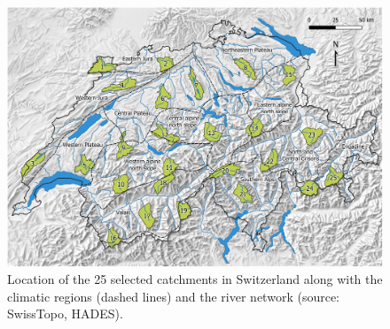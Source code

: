 \documentclass[draft]{agujournal2019}
\begin{document}
\begin{figure}[hbt]
	\noindent\includegraphics[width=140mm]{figures/map.jpg}
	\caption{Location of the 25 selected catchments in Switzerland along with the climatic regions (dashed lines) and the river network (source: SwissTopo, HADES).}
	\label{map}
\end{figure}
\end{document}
